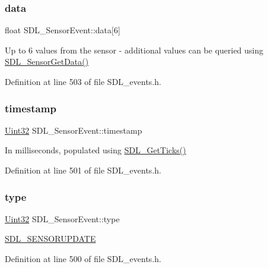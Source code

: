\subsubsection{\texorpdfstring{data}{data}}
{\footnotesize\ttfamily float S\+D\+L\+\_\+\+Sensor\+Event\+::data\mbox{[}6\mbox{]}}

Up to 6 values from the sensor -\/ additional values can be queried using \mbox{\hyperlink{_s_d_l__sensor_8h_a22466ee6b7af791937ebf1f7b76ed56b}{S\+D\+L\+\_\+\+Sensor\+Get\+Data()}} 

Definition at line 503 of file S\+D\+L\+\_\+events.\+h.

\mbox{\label{struct_s_d_l___sensor_event_a7de6c2b4d4791f5553b5de225293ceb5}} 
\subsubsection{\texorpdfstring{timestamp}{timestamp}}
{\footnotesize\ttfamily \mbox{\hyperlink{_s_d_l__stdinc_8h_add440eff171ea5f55cb00c4a9ab8672d}{Uint32}} S\+D\+L\+\_\+\+Sensor\+Event\+::timestamp}

In milliseconds, populated using \mbox{\hyperlink{_s_d_l__timer_8h_a0b9bc71d6287e0ffafdc3419760fe2b3}{S\+D\+L\+\_\+\+Get\+Ticks()}} 

Definition at line 501 of file S\+D\+L\+\_\+events.\+h.

\mbox{\label{struct_s_d_l___sensor_event_a0173d64fbe5299cad956298faf3fb0f9}} 
\subsubsection{\texorpdfstring{type}{type}}
{\footnotesize\ttfamily \mbox{\hyperlink{_s_d_l__stdinc_8h_add440eff171ea5f55cb00c4a9ab8672d}{Uint32}} S\+D\+L\+\_\+\+Sensor\+Event\+::type}

\mbox{\hyperlink{_s_d_l__events_8h_a3b589e89be6b35c02e0dd34a55f3fccaa1536ed6dfb1cdb20da84b7e2c602c022}{S\+D\+L\+\_\+\+S\+E\+N\+S\+O\+R\+U\+P\+D\+A\+TE}} 

Definition at line 500 of file S\+D\+L\+\_\+events.\+h.

\mbox{\label{struct_s_d_l___sensor_event_aa1c130192bad9b316f811f2d138b3b22}} 
